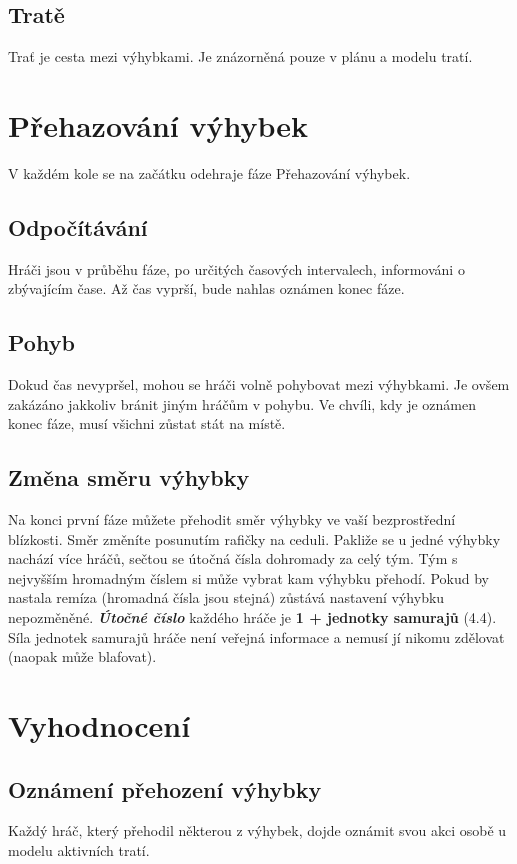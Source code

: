 \documentclass[11pt,a4paper,twocolumn, bold]{report}
\begin{document}
\subsection{Tratě}
Trať je cesta mezi výhybkami. Je znázorněná pouze v plánu a modelu tratí.

\section{Přehazování výhybek}
\noindent V každém kole se na začátku odehraje fáze Přehazování výhybek.

\subsection{Odpočítávání}
Hráči jsou v průběhu fáze, po určitých časových intervalech, informováni o zbývajícím čase. Až čas vyprší, bude nahlas oznámen konec fáze.

\subsection{Pohyb}
Dokud čas nevypršel, mohou se hráči volně pohybovat mezi výhybkami. Je ovšem zakázáno jakkoliv bránit jiným hráčům v pohybu. Ve chvíli, kdy je oznámen konec fáze, musí všichni zůstat stát na místě.

\subsection{Změna směru výhybky}
Na konci první fáze můžete přehodit směr výhybky ve vaší bezprostřední blízkosti. Směr změníte posunutím rafičky na ceduli. Pakliže se u jedné výhybky nachází více hráčů, sečtou se útočná čísla dohromady za celý tým. Tým s nejvyšším hromadným číslem si může vybrat kam výhybku přehodí. Pokud by nastala remíza (hromadná čísla jsou stejná) zůstává nastavení výhybku nepozměněné. \textit{\textbf{Útočné číslo}} každého hráče je \textbf{1 + jednotky samurajů} (4.4). Síla jednotek samurajů hráče není veřejná informace a nemusí jí nikomu zdělovat (naopak může blafovat).

\section{Vyhodnocení}
\subsection{Oznámení přehození výhybky}
Každý hráč, který přehodil některou z výhybek, dojde oznámit svou akci osobě u modelu aktivních tratí.
\end{document}
